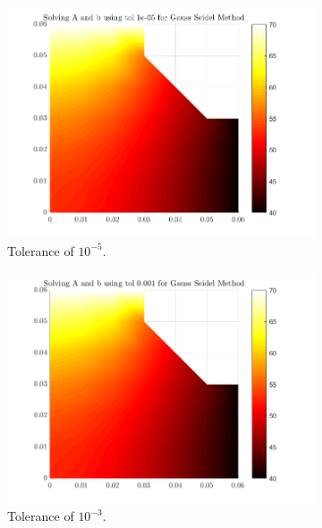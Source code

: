 \documentclass[12pt,a4paper]{article}
\begin{document}
\begin{figure}[H]
	\centering
	\begin{subfigure}[b]{0.48\textwidth}
		\centering
		\includegraphics[width=\linewidth]{images/GaussComparisontole-05.png}
		\caption{Tolerance of $10^{-5}$.}
		\label{fig:Gausstole-05}
	\end{subfigure}
	\hfill
	\begin{subfigure}[b]{0.48\textwidth}
		\centering
		\includegraphics[width=\linewidth]{images/GaussComparisontol0-001.png}
		\caption{Tolerance of $10^{-3}$.}
		\label{fig:Gausstol0.001}
	\end{subfigure}
	\hfill
	\begin{subfigure}[b]{0.48\textwidth}
		\centering

\end{subfigure}
\end{figure}
\end{document}
